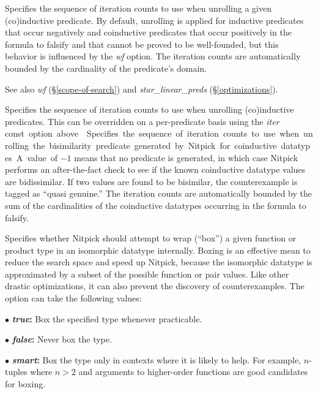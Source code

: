 \documentclass[a4paper,12pt]{article}
\begin{document}
\begin{enum}
Specifies the sequence of iteration counts to use when unrolling a given
(co)in\-duc\-tive predicate. By default, unrolling is applied for inductive
predicates that occur negatively and coinductive predicates that occur
positively in the formula to falsify and that cannot be proved to be
well-founded, but this behavior is influenced by the \textit{wf} option. The
iteration counts are automatically bounded by the cardinality of the predicate's
domain.

{\small See also \textit{wf} (\S\ref{scope-of-search}) and
\textit{star\_linear\_preds} (\S\ref{optimizations}).}

Specifies the sequence of iteration counts to use when unrolling (co)in\-duc\-tive
predicates. This can be overridden on a per-predicate basis using the
\textit{iter} \qty{const} option above.

Specifies the sequence of iteration counts to use when unrolling the
bisimilarity predicate generated by Nitpick for coinductive datatypes. A value
of $-1$ means that no predicate is generated, in which case Nitpick performs an
after-the-fact check to see if the known coinductive datatype values are
bidissimilar. If two values are found to be bisimilar, the counterexample is
tagged as ``quasi genuine.'' The iteration counts are automatically bounded by
the sum of the cardinalities of the coinductive datatypes occurring in the
formula to falsify.

Specifies whether Nitpick should attempt to wrap (``box'') a given function or
product type in an isomorphic datatype internally. Boxing is an effective mean
to reduce the search space and speed up Nitpick, because the isomorphic datatype
is approximated by a subset of the possible function or pair values.
Like other drastic optimizations, it can also prevent the discovery of
counterexamples. The option can take the following values:

\begin{enum}
\item[$\bullet$] \textbf{\textit{true}:} Box the specified type whenever
practicable.
\item[$\bullet$] \textbf{\textit{false}:} Never box the type.
\item[$\bullet$] \textbf{\textit{smart}:} Box the type only in contexts where it
is likely to help. For example, $n$-tuples where $n > 2$ and arguments to
higher-order functions are good candidates for boxing.
\end{enum}


\end{enum}
\end{document}

